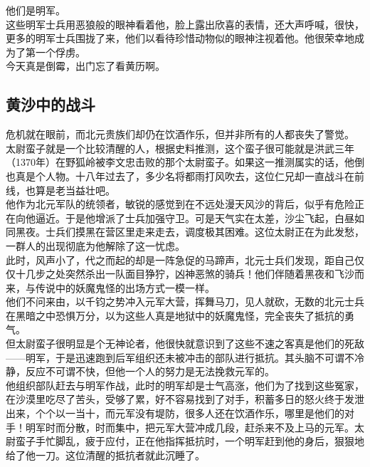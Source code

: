 \begin{multicols}{\theparacolNo}
他们是明军。\\

这些明军士兵用恶狼般的眼神看着他，脸上露出欣喜的表情，还大声呼喊，很快，更多的明军士兵围拢了来，他们以看待珍惜动物似的眼神注视着他。他很荣幸地成为了第一个俘虏。\\

今天真是倒霉，出门忘了看黄历啊。\\

\subsection{黄沙中的战斗}
危机就在眼前，而北元贵族们却仍在饮酒作乐，但并非所有的人都丧失了警觉。\\

太尉蛮子就是一个比较清醒的人，根据史料推测，这个蛮子很可能就是洪武三年（1370年）在野狐岭被李文忠击败的那个太尉蛮子。如果这一推测属实的话，他倒也真是个人物。十八年过去了，多少名将都雨打风吹去，这位仁兄却一直战斗在前线，也算是老当益壮吧。\\

他作为北元军队的统领者，敏锐的感觉到在不远处漫天风沙的背后，似乎有危险正在向他逼近。于是他增派了士兵加强守卫。可是天气实在太差，沙尘飞起，白昼如同黑夜。士兵们摸黑在营区里走来走去，调度极其困难。这位太尉正在为此发愁，一群人的出现彻底为他解除了这一忧虑。\\

此时，风声小了，代之而起的却是一阵急促的马蹄声，北元士兵们发现，距自己仅仅十几步之处突然杀出一队面目狰狞，凶神恶煞的骑兵！他们伴随着黑夜和飞沙而来，与传说中的妖魔鬼怪的出场方式一模一样。\\

他们不问来由，以千钧之势冲入元军大营，挥舞马刀，见人就砍，无数的北元士兵在黑暗之中恐惧万分，以为这些人真是地狱中的妖魔鬼怪，完全丧失了抵抗的勇气。\\

但太尉蛮子很明显是个无神论者，他很快就意识到了这些不速之客真是他们的死敌——明军，于是迅速跑到后军组织还未被冲击的部队进行抵抗。其头脑不可谓不冷静，反应不可谓不快，但他一个人的努力是无法挽救元军的。\\

他组织部队赶去与明军作战，此时的明军却是士气高涨，他们为了找到这些冤家，在沙漠里吃尽了苦头，受够了累，好不容易找到了对手，积蓄多日的怒火终于发泄出来，个个以一当十，而元军没有堤防，很多人还在饮酒作乐，哪里是他们的对手！明军时而分散，时而集中，把元军大营冲成几段，赶杀来不及上马的元军。太尉蛮子手忙脚乱，疲于应付，正在他指挥抵抗时，一个明军赶到他的身后，狠狠地给了他一刀。这位清醒的抵抗者就此沉睡了。\\


\end{multicols}

